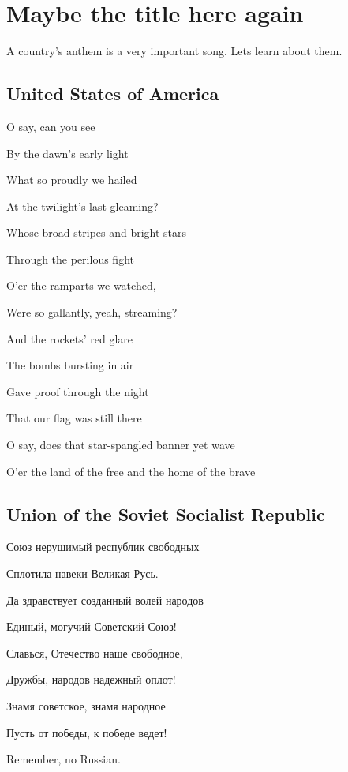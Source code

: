 \chapter*{Maybe the title here again}   

A country's anthem is a very important song. Lets learn about them.

\section{United States of America}
O say, can you see

By the dawn's early light

What so proudly we hailed

At the twilight's last gleaming?

Whose broad stripes and bright stars

Through the perilous fight

O'er the ramparts we watched,

Were so gallantly, yeah, streaming?

And the rockets' red glare

The bombs bursting in air

Gave proof through the night

That our flag was still there

O say, does that star-spangled banner yet wave

O'er the land of the free and the home of the brave


\section{Union of the Soviet Socialist Republic}
Союз нерушимый республик свободных

Сплотила навеки Великая Русь.

Да здравствует созданный волей народов

Единый, могучий Советский Союз!

Славься, Отечество наше свободное,

Дружбы, народов надежный оплот!

Знамя советское, знамя народное

Пусть от победы, к победе ведет!

\begin{remark}
    Remember, no Russian.
\end{remark}

